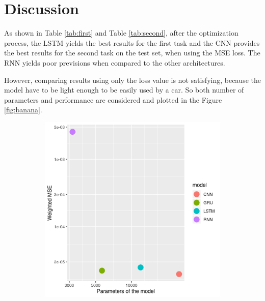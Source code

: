 \section{Discussion}
As shown in Table \ref{tab:first} and Table \ref{tab:second}, after the optimization process, the LSTM yields the best results for the first task and the CNN provides the best results for the second task on the test set, when using the MSE loss.
The RNN yields poor previsions when compared to the other architectures.

However, comparing results using only the loss value is not satisfying, because the model have to be light enough to be easily used by a car. So both number of parameters and performance are considered and plotted in the Figure \ref{fig:banana}.
\begin{figure}[!h]
  \centering
  \begin{subfigure}[b]{0.4\linewidth} \includegraphics[width=\linewidth]{imgs/performance_parameters_Weighted_MSE1.png}
  \end{subfigure}

\end{figure}
